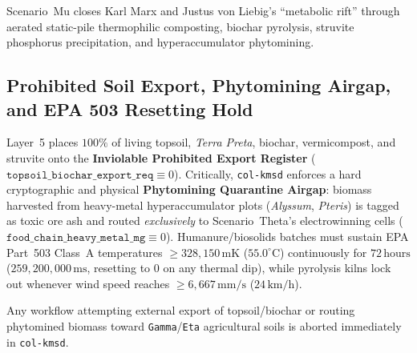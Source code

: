Scenario~Mu closes Karl Marx and Justus von Liebig's ``metabolic rift'' through aerated static-pile
thermophilic composting, biochar pyrolysis, struvite phosphorus precipitation, and hyperaccumulator
phytomining.

\subsection{Prohibited Soil Export, Phytomining Airgap, and EPA 503 Resetting Hold}

Layer~5 places $100\%$ of living topsoil, \textit{Terra Preta}, biochar, vermicompost, and struvite
onto the \textbf{Inviolable Prohibited Export Register} ($\mathtt{topsoil\_biochar\_export\_req} \equiv 0$).
Critically, \texttt{col-kmsd} enforces a hard cryptographic and physical \textbf{Phytomining Quarantine
Airgap}: biomass harvested from heavy-metal hyperaccumulator plots (\textit{Alyssum}, \textit{ Pteris})
is tagged as toxic ore ash and routed \textit{exclusively} to Scenario~Theta's electrowinning cells
($\mathtt{food\_chain\_heavy\_metal\_mg} \equiv 0$). Humanure/biosolids batches must sustain EPA
Part~503 Class~A temperatures $\ge 328{,}150\,\mathrm{mK}$ ($55.0^\circ\mathrm{C}$) continuously for
$72\,\mathrm{hours}$ ($259{,}200{,}000\,\mathrm{ms}$, resetting to $0$ on any thermal dip), while
pyrolysis kilns lock out whenever wind speed reaches $\ge 6{,}667\,\mathrm{mm/s}$ ($24\,\mathrm{km/h}$).

\begin{invariant}
\label{inv:waved-mu-quarantine}
Any workflow attempting external export of topsoil/biochar or routing phytomined biomass toward
\texttt{Gamma}/\texttt{Eta} agricultural soils is aborted immediately in \texttt{col-kmsd}.
\end{invariant}


